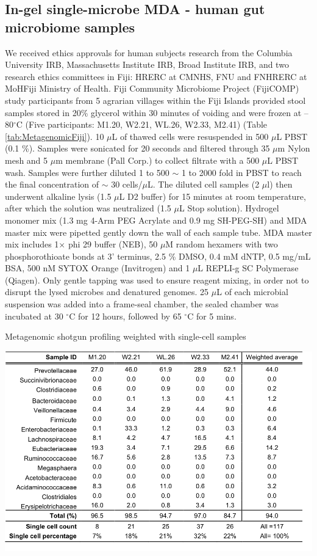 \subsection{In-gel single-microbe MDA - human gut microbiome samples}
We received ethics approvals for human subjects research from the Columbia University IRB, Massachusetts Institute IRB, Broad Institute IRB, and two research ethics committees in Fiji: HRERC at CMNHS, FNU and FNHRERC at MoHFiji Ministry of Health. Fiji Community Microbiome Project (FijiCOMP) study participants from 5 agrarian villages within the Fiji Islands provided stool samples stored in 20\% glycerol within 30 minutes of voiding and were frozen at --80$^{\circ}$C (Five participants: M1.20, W2.21, WL.26, W2.33, M2.41) (Table \ref{tab:MetagenomicFiji}). 10 $\mu$L of thawed cells were resuspended in 500 $\mu$L PBST (0.1 \%). Samples were sonicated for 20 seconds and filtered through 35 $\mu$m Nylon mesh and 5 $\mu$m membrane (Pall Corp.) to collect filtrate with a 500 $\mu$L PBST wash. Samples were further diluted 1 to 500 $\sim$ 1 to 2000 fold in PBST to reach the final concentration of $\sim$ 30 cells\slash $\mu$L. The diluted cell samples (2 $\mu$l) then underwent alkaline lysis (1.5 $\mu$L D2 buffer) for 15 minutes at room temperature, after which the solution was neutralized (1.5 $\mu$L Stop solution). Hydrogel monomer mix (1.3 mg 4-Arm PEG Acrylate and 0.9 mg SH-PEG-SH) and MDA master mix were pipetted gently down the wall of each sample tube. MDA master mix includes 1$\times$ phi 29 buffer (NEB), 50 $\mu$M random hexamers with two phosphorothioate bonds at 3' terminus, 2.5 \% DMSO, 0.4 mM dNTP, 0.5 mg\slash mL BSA, 500 nM SYTOX Orange (Invitrogen) and 1 $\mu$L REPLI-g SC Polymerase (Qiagen). Only gentle tapping was used to ensure reagent mixing, in order not to disrupt the lysed microbes and denatured genomes. 25 $\mu$L of each microbial suspension was added into a frame-seal chamber, the sealed chamber was incubated at 30 $^{\circ}$C for 12 hours, followed by 65 $^{\circ}$C for 5 mins.

\begin{table}
\caption{Metagenomic shotgun profiling weighted with single-cell samples}
\label{tab:MetagenomicFiji}
\includegraphics[width=\linewidth]{./figures/MetagenomicShotgunProfilingFiji}
\end{table}

